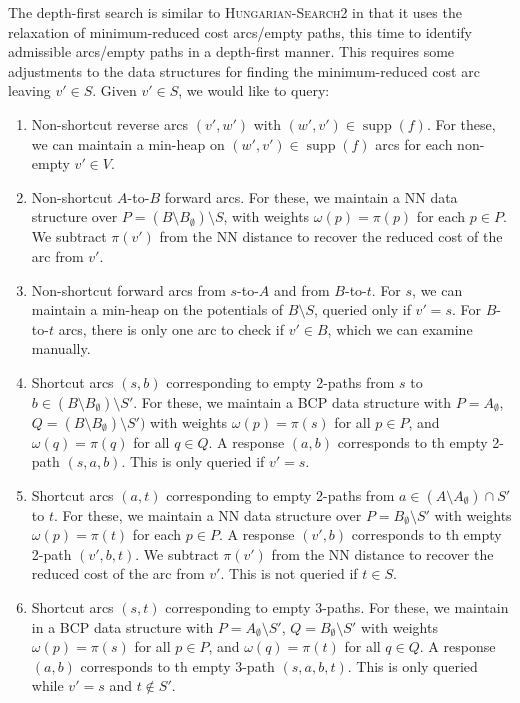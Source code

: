 \documentclass[11pt]{article}
\def\supp{\operatorname{supp}}
\theoremstyle{plain}
\numberwithin{figure}{section}
\begin{document}
The depth-first search is similar to \textsc{Hungarian-Search2} in that it
uses the relaxation of minimum-reduced cost arcs/empty paths, this time to
identify admissible arcs/empty paths in a depth-first manner.
This requires some adjustments to the data structures for finding the
minimum-reduced cost arc leaving $v' \in S$.
Given $v' \in S$, we would like to query:
\begin{enumerate}
\item Non-shortcut reverse arcs $(v', w')$ with $(w', v') \in \supp(f)$.
	For these, we can maintain a min-heap on $(w', v') \in \supp(f)$ arcs
	for each non-empty $v' \in V$.
\item Non-shortcut $A$-to-$B$ forward arcs.
	For these, we maintain a NN data structure over
	$P = (B \setminus B_\emptyset) \setminus S$, with weights
	$\omega(p) = \pi(p)$ for each $p \in P$.
	We subtract $\pi(v')$ from the NN distance to recover the reduced cost
	of the arc from $v'$.
\item Non-shortcut forward arcs from $s$-to-$A$ and from $B$-to-$t$.
	For $s$, we can maintain a min-heap on the potentials of
	$B \setminus S$, queried only if $v' = s$.
	For $B$-to-$t$ arcs, there is only one arc to check if $v' \in B$,
	which we can examine manually.

\item Shortcut arcs $(s, b)$ corresponding to empty 2-paths from $s$ to
	$b \in (B \setminus B_\emptyset) \setminus S'$.
	For these, we maintain a BCP data structure with $P = A_\emptyset$,
	$Q = (B \setminus B_\emptyset) \setminus S')$ with weights
	$\omega(p) = \pi(s)$ for all $p \in P$, and $\omega(q) = \pi(q)$ for
	all $q \in Q$.
	A response $(a, b)$ corresponds to th empty 2-path $(s, a, b)$.
	This is only queried if $v' = s$.
\item Shortcut arcs $(a, t)$ corresponding to empty 2-paths from
	$a \in (A \setminus A_\emptyset) \cap S'$ to $t$.
	For these, we maintain a NN data structure over
	$P = B_\emptyset \setminus S'$ with weights $\omega(p) = \pi(t)$ for
	each $p \in P$.
	A response $(v', b)$ corresponds to th empty 2-path $(v', b, t)$.
	We subtract $\pi(v')$ from the NN distance to recover the reduced cost
	of the arc from $v'$.
	This is not queried if $t \in S$.
\item Shortcut arcs $(s, t)$ corresponding to empty 3-paths.
	For these, we maintain in a BCP data structure with
	$P = A_\emptyset \setminus S'$, $Q = B_\emptyset \setminus S'$ with
	weights $\omega(p) = \pi(s)$ for all
	$p \in P$, and $\omega(q) = \pi(t)$ for all $q \in Q$.
	A response $(a, b)$ corresponds to th empty 3-path $(s, a, b, t)$.
	This is only queried while $v' = s$ and $t \not\in S'$.
\end{enumerate}
\end{document}
